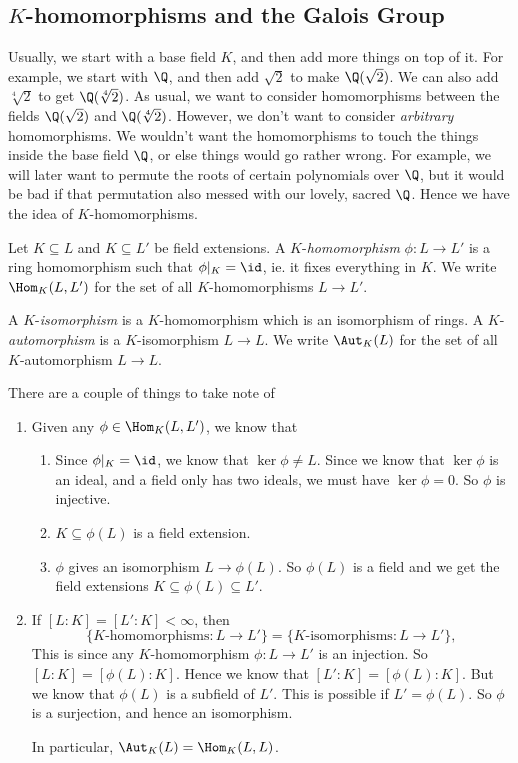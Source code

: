 \documentclass[a4paper]{article}
\begin{document}
\subsection{\texorpdfstring{$K$}{K}-homomorphisms and the Galois Group}
Usually, we start with a base field $K$, and then add more things on top of it. For example, we start with $\Q$, and then add $\sqrt{2}$ to make $\Q(\sqrt{2})$. We can also add $\sqrt[4]{2}$ to get $\Q(\sqrt[4]{2})$. As usual, we want to consider homomorphisms between the fields $\Q(\sqrt{2})$ and $\Q(\sqrt[4]{2})$. However, we don't want to consider \emph{arbitrary} homomorphisms. We wouldn't want the homomorphisms to touch the things inside the base field $\Q$, or else things would go rather wrong. For example, we will later want to permute the roots of certain polynomials over $\Q$, but it would be bad if that permutation also messed with our lovely, sacred $\Q$. Hence we have the idea of $K$-homomorphisms.

\begin{defi}[$K$-homomorphism]
  Let $K\subseteq L$ and $K\subseteq L'$ be field extensions. A $K$-\emph{homomorphism} $\phi: L \to L'$ is a ring homomorphism such that $\phi|_K = \id$, ie. it fixes everything in $K$. We write $\Hom_K(L, L')$ for the set of all $K$-homomorphisms $L\to L'$.

  A $K$-\emph{isomorphism} is a $K$-homomorphism which is an isomorphism of rings. A $K$-\emph{automorphism} is a $K$-isomorphism $L\to L$. We write $\Aut_K(L)$ for the set of all $K$-automorphism $L\to L$.
\end{defi}
There are a couple of things to take note of
\begin{enumerate}
  \item Given any $\phi \in \Hom_K(L, L')$, we know that
    \begin{enumerate}
      \item Since $\phi|_K = \id$, we know that $\ker \phi \not= L$. Since we know that $\ker \phi$ is an ideal, and a field only has two ideals, we must have $\ker \phi = 0$. So $\phi$ is injective.
      \item $K\subseteq \phi(L)$ is a field extension.
      \item $\phi$ gives an isomorphism $L \to \phi(L)$. So $\phi(L)$ is a field and we get the field extensions $K\subseteq \phi(L) \subseteq L'$.
    \end{enumerate}
  \item If $[L:K] = [L':K] < \infty$, then
    \[
      \{K\text{-homomorphisms}: L \to L'\} = \{K\text{-isomorphisms}: L\to L'\},
    \]
    This is since any $K$-homomorphism $\phi: L\to L'$ is an injection. So $[L:K] = [\phi(L):K]$. Hence we know that $[L':K] = [\phi(L):K]$. But we know that $\phi(L)$ is a subfield of $L'$. This is possible if $L' = \phi(L)$. So $\phi$ is a surjection, and hence an isomorphism.

    In particular, $\Aut_K(L) = \Hom_K(L, L)$.
\end{enumerate}
\end{document}

